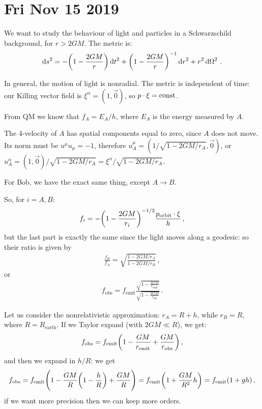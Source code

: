 \documentclass[main.tex]{subfiles}
\begin{document}
\section*{Fri Nov 15 2019}

We want to study the behaviour of light and particles in a Schwarzschild background, for \(r > 2 GM\). The metric is: 
%
\begin{align}
  \dd{s^2} = - \qty(1 - \frac{2GM}{r}) \dd{t^2} 
  + \qty(1 - \frac{2GM}{r})^{-1} \dd{r^2}
  + r^2 \dd{\Omega^2}
\,.
\end{align}

In general, the motion of light is nonradial.
The metric is independent of time: our Killing vector field is \(\xi^{\alpha } = (1, \vec{0} )\), so \(p \cdot \xi = \text{const}\).

From QM we know that \(f_A = E_A / h\), where \(E_A\) is the energy measured by \(A\).

The 4-velocity of \(A\) has spatial components equal to zero, since \(A\) does not move.
Its norm must be  \(u^{\mu } u_{\mu } = -1\), therefore \(u^{\mu }_A = (1/ \sqrt{1 - 2GM / r_A}, \vec{0})\), or \(u^{\alpha}_A = (1, \vec{0}) / \sqrt{1 - 2GM / r_A} = \xi^{\alpha } / \sqrt{1 - 2GM/r_A}\).

For Bob, we have the exact same thing, except \(A \rightarrow B\).

So, for \(i = A, B\): 
%
\begin{align}
  f_i = - \qty(1 - \frac{2GM}{r_i})^{-1/2} \frac{p _{\text{orbit}} \cdot \xi }{h}
\,,
\end{align}
%
but the last part is exactly the same since the light moves along a geodesic: so their ratio is given by
%
\begin{align}
  \frac{f_B}{f_A} = \sqrt{\frac{1-2GM /r_A}{1-2GM/r_B}}
\,,
\end{align}
%
or 
%
\begin{align}
  f _{\text{obs}} = f _{\text{emit}} \frac{\sqrt{1 - \frac{2GM}{r _{\text{emit}}}}}{\sqrt{1 - \frac{2GM}{r _{\text{obs}}}}}
\,.
\end{align}

Let us consider the nonrelativistic approximation: \(r_A = R + h\), while \(r_B = R\), where \(R = R _{\text{earth}}\).
If we Taylor expand (with \(2GM \ll R\)), we get: 
%
\begin{align}
  f _{\text{obs}} = f _{\text{emit}} \qty(1 - \frac{GM}{r _{\text{emit}}} + \frac{GM}{r _{\text{obs}}})
\,,
\end{align}
%
and then we expand in \(h/R\): we get 
%
\begin{align}
    f _{\text{obs}} = f _{\text{emit}} \qty(1 - \frac{GM}{R} \qty(1 - \frac{h}{R}) + \frac{GM}{R}) 
    = f _{\text{emit}} \qty(1 + \frac{GM}{R^2} h)
    = f _{\text{emit}} \qty(1 + g h)
  \,,
\end{align}
%
if we want more precision then we can keep more orders.
\end{document}
